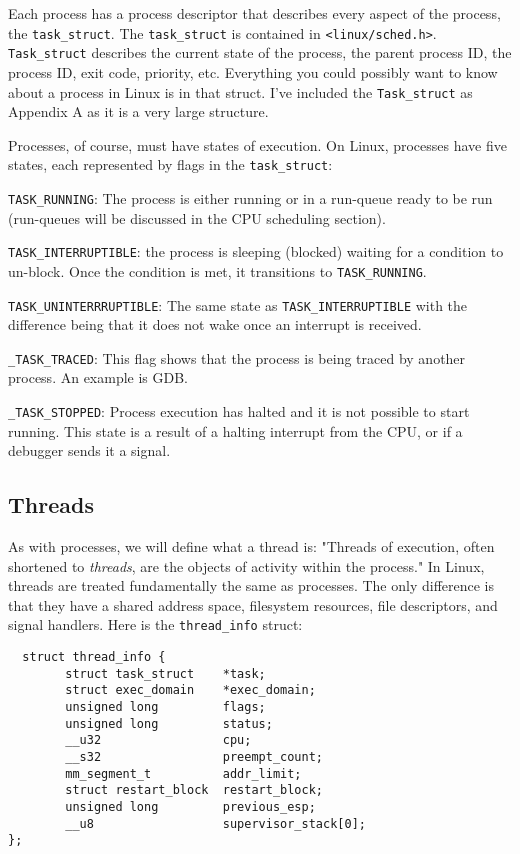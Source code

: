 \documentclass[10pt,letterpaper,onecolumn,draftclsnofoot]{IEEEtran}
\begin{document}
Each process has a process descriptor that describes every aspect of
the process, the \texttt{task\_struct}. The \texttt{task\_struct} is contained
in \texttt{<linux/sched.h>}. \texttt{Task\_struct} describes the current state
of the process, the parent process ID, the process ID, exit code, priority, etc.
Everything you could possibly want to know about a process in Linux is in that
struct. I've included the \texttt{Task\_struct} as Appendix A as it is a very
large structure.

Processes, of course, must have states of execution. On Linux, processes have
five states, each represented by flags in the \texttt{task\_struct}:

\begin{description}
  \item \texttt{TASK\_RUNNING}: The process is either running or in a run-queue
  ready to be run (run-queues will be discussed in the CPU scheduling section).
  \item \texttt{TASK\_INTERRUPTIBLE}: the process is sleeping (blocked) waiting
  for a condition to un-block. Once the condition is met, it transitions to
  \texttt{TASK\_RUNNING}.
  \item \texttt{TASK\_UNINTERRRUPTIBLE}: The same state as \texttt{TASK\_INTERRUPTIBLE}
  with the difference being that it does not wake once an interrupt is received.
  \item \texttt{\_TASK\_TRACED}: This flag shows that the process is being traced
  by another process. An example is GDB.
  \item \texttt{\_TASK\_STOPPED}: Process execution has halted and it is not
  possible to start running. This state is a result of a halting interrupt from
  the CPU, or if a debugger sends it a signal.
\end{description}

  \subsection{Threads}
As with processes, we will define what a thread is: "Threads of execution, often
shortened to \textit{threads}, are the objects of activity within the process."
\cite{robertlove2010} In Linux, threads are treated fundamentally the same as
processes. The only difference is that they have a shared address space,
filesystem resources, file descriptors, and signal handlers. Here is the
\texttt{thread\_info} struct:\cite{robertlove2010}

\begin{lstlisting}
  struct thread_info {
        struct task_struct    *task;
        struct exec_domain    *exec_domain;
        unsigned long         flags;
        unsigned long         status;
        __u32                 cpu;
        __s32                 preempt_count;
        mm_segment_t          addr_limit;
        struct restart_block  restart_block;
        unsigned long         previous_esp;
        __u8                  supervisor_stack[0];
};
\end{lstlisting}
\end{document}
